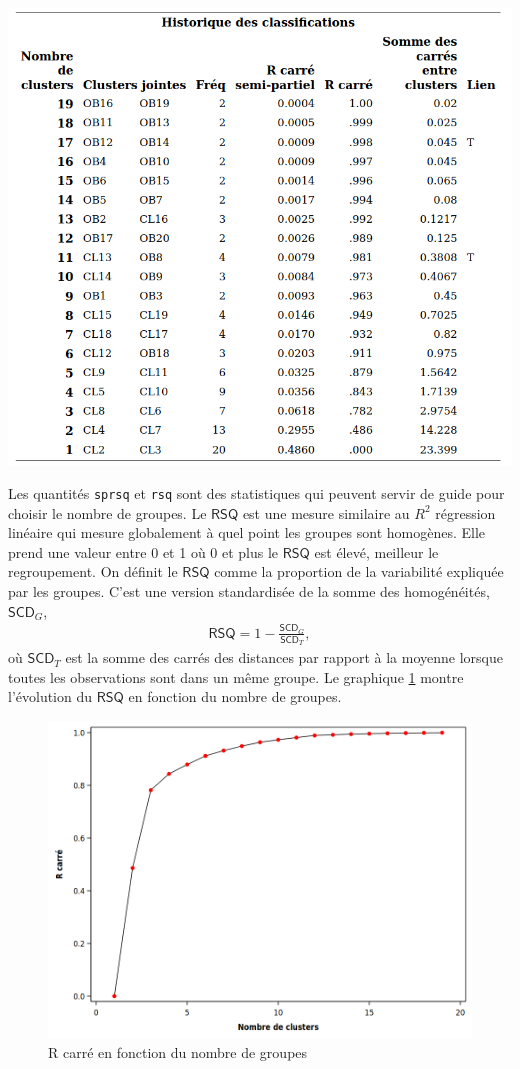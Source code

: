 \documentclass[
  11pt,
  letterpaper,
]{book}
\theoremstyle{definition}
\theoremstyle{definition}
\theoremstyle{definition}
\theoremstyle{remark}
\begin{document}
\begin{center}\includegraphics[width=0.8\linewidth]{figures/04-clustering-e3} \end{center}

Les quantités \texttt{sprsq} et \texttt{rsq} sont des statistiques qui peuvent servir de guide pour choisir le nombre de groupes. Le \(\mathsf{RSQ}\) est une mesure similaire au \(R^2\) régression linéaire qui mesure globalement à quel point les groupes sont homogènes. Elle prend une valeur entre 0 et 1 où 0 et plus le \(\mathsf{RSQ}\) est élevé, meilleur le regroupement.
On définit le \(\mathsf{RSQ}\) comme la proportion de la variabilité expliquée par les groupes. C'est une version standardisée de la somme des homogénéités, \(\mathsf{SCD}_G\),
\begin{align*}
\mathsf{RSQ} = 1-\frac{\mathsf{SCD}_G}{\mathsf{SCD}_T},
\end{align*}
où \(\mathsf{SCD}_T\) est la somme des carrés des distances par rapport à la moyenne lorsque toutes les observations sont dans un même groupe. Le graphique \ref{fig:fig4-e4} montre l'évolution du \(\mathsf{RSQ}\) en fonction du nombre de groupes.

\begin{figure}

{\centering \includegraphics[width=0.8\linewidth]{figures/04-clustering-e4} 

}

\caption{R carré en fonction du nombre de groupes}\label{fig:fig4-e4}
\end{figure}
\end{document}
